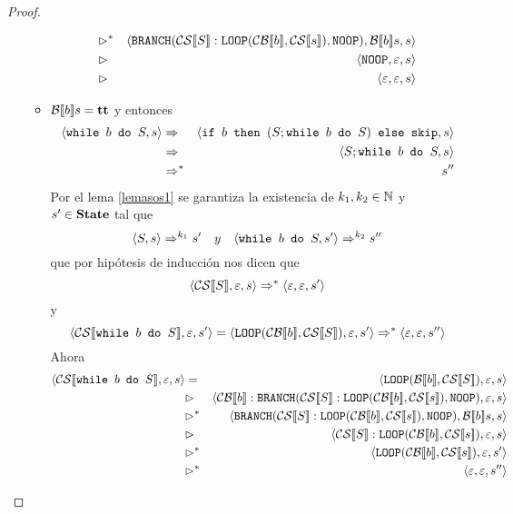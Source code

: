\begin{lema}
\begin{proof}
\begin{itemize}
\begin{itemize}
\begin{eqnarray*}
                &\rhd^*& \conf{\n{BRANCH}(\fc{CS}{S}:\n{LOOP}(\fc{CB}{b}, \fc{CS}{s}), \n{NOOP})}{\fc{B}{b}s}{s} \\
                &\rhd& \conf{\n{NOOP}}{\varepsilon}{s} \\
                &\rhd& \conf{\varepsilon}{\varepsilon}{s}
            \end{eqnarray*}
        \item $\mathcal{B}[\![b]\!]s = \textbf{tt}$ y entonces
        \begin{eqnarray*}
            \langle \texttt{while } b \texttt{ do } S, s \rangle &\Rightarrow& \langle \texttt{if } b \texttt{ then } (S; \texttt{while } b \texttt{ do } S) \texttt{ else } \texttt{skip}, s \rangle \\
            &\Rightarrow& \langle S;\texttt{while } b \texttt{ do } S, s \rangle \\
            &\Rightarrow^{*}& s''
        \end{eqnarray*}
        Por el lema \ref{lemasos1} se garantiza la existencia de $k_1, k_2\in\mathbb{N}$ y $s'\in\textbf{State}$ tal que
        \[
            \la{S}{s} \dto^{k_1} s'\ \ \ y\ \ \ \la{\nwhile b \ndo S}{s'} \dto^{k_2} s''
        \]
        que por hipótesis de inducción nos dicen que
        \[
            \langle \mathcal{CS}[\![S]\!], \varepsilon, s \rangle \Rightarrow^* \langle \varepsilon, \varepsilon, s' \rangle
        \]
        y
        \[
            \langle \mathcal{CS}[\![\texttt{while } b \texttt{ do } S]\!], \varepsilon, s' \rangle = \langle \texttt{LOOP}(\mathcal{CB}[\![b]\!], \mathcal{CS}[\![S]\!]), \varepsilon, s' \rangle \\
            \Rightarrow^* \langle \varepsilon, \varepsilon, s'' \rangle \\
        \]
        Ahora
        \begin{eqnarray*}
            \conf{\fc{CS}{\nwhile b \ndo S}}{\varepsilon}{s} &=& \conf{\n{LOOP}(\fc{B}{b}, \fc{CS}{S})}{\varepsilon}{s} \\
            &\rhd&  \conf{\fc{CB}{b}:\n{BRANCH}(\fc{CS}{S}:\n{LOOP}(\fc{CB}{b}, \fc{CS}{s}), \n{NOOP})}{\varepsilon}{s} \\
            &\rhd^*& \conf{\n{BRANCH}(\fc{CS}{S}:\n{LOOP}(\fc{CB}{b}, \fc{CS}{s}), \n{NOOP})}{\fc{B}{b}s}{s} \\
            &\rhd& \conf{\fc{CS}{S}:\n{LOOP}(\fc{CB}{b}, \fc{CS}{s})}{\varepsilon}{s} \\
            &\rhd^*& \conf{\n{LOOP}(\fc{CB}{b}, \fc{CS}{s})}{\varepsilon}{s'} \\
            &\rhd^*& \conf{\varepsilon}{\varepsilon}{s''}
        \end{eqnarray*}
    \end{itemize}
\end{itemize}
\end{proof}
\end{lema}

